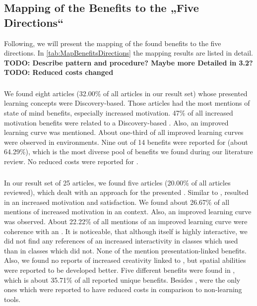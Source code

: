 \subsection{Mapping of the Benefits to the „Five Directions“}
\label{subsec:Mapping}
Following, we will present the mapping of the found benefits to the five directions. In \ref{tab:MapBenefitsDirections} the mapping results are listed in detail. \\
\textbf{TODO: Describe pattern and procedure? Maybe more Detailed in 3.2?} \\
\textbf{TODO: Reduced costs changed} 

\subsubsection{\DBLns}
We found eight articles (32.00\% of all articles in our result set) whose presented learning concepts were Discovery-based. Those articles had the most mentions of state of mind benefits, especially increased motivation. 47\% of all increased motivation benefits were related to a Discovery-based \AR \appns. Also, an improved learning curve was mentioned. About one-third of all improved learning curves were observed in \DBL environments. Nine out of 14 benefits were reported for \DBL \apps (about 64.29\%), which is the most diverse pool of benefits we found during our literature review. No reduced costs were reported for \DBL \appsns.

\subsubsection{\OMns}
In our result set of 25 articles, we found five articles (20.00\% of all articles reviewed), which dealt with an \OM approach for the presented \AR \appns. Similar to \DBL \appsns, \OM resulted in an increased motivation and satisfaction. We found about 26.67\% of all mentions of increased motivation in an \OM context. Also, an improved learning curve was observed. About 22.22\% of all mentions of an improved learning curve were coherence with an \OM \appns. It is noticeable, that although \OM itself is highly interactive, we did not find any references of an increased interactivity in classes which used \AR than in classes which did not. None of the \OM \apps mention presentation-linked benefits. Also, we found no reports of increased creativity linked to \OM, but spatial abilities were reported to be developed better. Five different benefits were found in \OM \appsns, which is about 35.71\% of all reported unique benefits. Besides \ST \appsns, \OM \apps were the only ones which were reported to have reduced costs in comparison to non-\AR learning tools.

